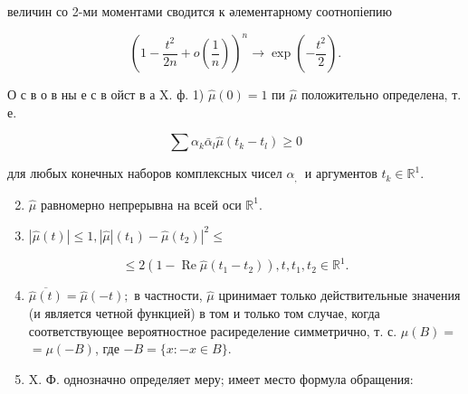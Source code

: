 \documentclass[10pt]{article}
\begin{document}
величин со 2-ми моментами сводится к әлементарному соотнопіепию



\[

\left(1-\frac{t^{2}}{2 n}+o\left(\frac{1}{n}\right)\right)^{n} \rightarrow \exp \left(-\frac{t^{2}}{2}\right) .

\]



О с в о в ны е с в ойст в а X. ф. 1) $\hat{\mu}(0)=1$ пи $\hat{\mu}$ положительно определена, т. е.



\[

\sum \alpha_{k} \bar{\alpha}_{l} \hat{\mu}\left(t_{k}-t_{l}\right) \geqslant 0

\]



для любых конечных наборов комплексных чисел $\alpha_{\text {, }}$ и аргументов $t_{k} \in \mathbb{R}^{1}$.



\begin{enumerate}

  \setcounter{enumi}{1}

  \item $\hat{\mu}$ равномерно непрерывна на всей оси $\mathbb{R}^{1}$.



  \item $|\hat{\mu}(t)| \leqslant 1,|\hat{\mu}|\left(t_{1}\right)-\left.\hat{\mu}\left(t_{2}\right)\right|^{2} \leqslant$



\end{enumerate}



\[

\leqslant 2\left(1-\operatorname{Re} \hat{\mu}\left(t_{1}-t_{2}\right)\right), t, t_{1}, t_{2} \in \mathbb{R}^{1} .

\]



\begin{enumerate}

  \setcounter{enumi}{3}

  \item $\overline{\hat{\mu}(t)}=\hat{\mu}(-t) ;$ в частности, $\hat{\mu}$ цринимает только действительные значения (и является четной функцией) в том и только том случае, когда соответствующее вероятностное расиределение симметрично, т. с. $\mu(B)=$ $=\mu(-B)$, где $-B=\{x:-x \in B\}$.



  \item X. Ф. однозначно определяет меру; имеет место формула обращения:



\end{enumerate}
\end{document}
